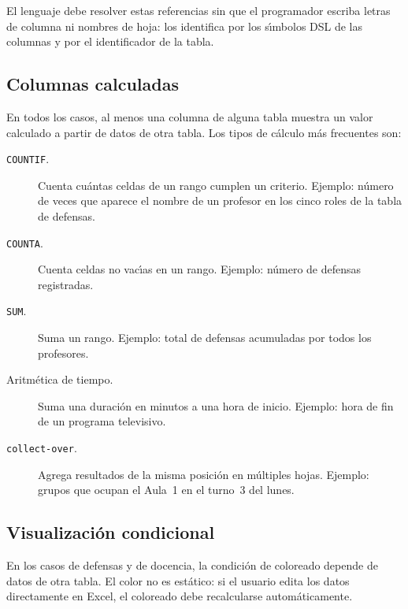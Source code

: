El lenguaje debe resolver estas referencias sin que el programador escriba
letras de columna ni nombres de hoja: los identifica por los s\'{\i}mbolos
DSL de las columnas y por el identificador de la tabla.

\subsection{Columnas calculadas}
\label{ssec:elem-computed}

En todos los casos, al menos una columna de alguna tabla muestra un valor
calculado a partir de datos de otra tabla.  Los tipos de c\'alculo m\'as
frecuentes son:

\begin{description}
  \item[\texttt{COUNTIF}.] Cuenta cu\'antas celdas de un rango cumplen un
    criterio.  Ejemplo: n\'umero de veces que aparece el nombre de un
    profesor en los cinco roles de la tabla de defensas.

  \item[\texttt{COUNTA}.] Cuenta celdas no vac\'{\i}as en un rango.  Ejemplo:
    n\'umero de defensas registradas.

  \item[\texttt{SUM}.] Suma un rango.  Ejemplo: total de defensas acumuladas
    por todos los profesores.

  \item[Aritmética de tiempo.] Suma una duraci\'on en minutos a una hora de
    inicio.  Ejemplo: hora de fin de un programa televisivo.

  \item[\texttt{collect-over}.] Agrega resultados de la misma posici\'on en
    m\'ultiples hojas.  Ejemplo: grupos que ocupan el Aula~1 en el turno~3
    del lunes.
\end{description}

\subsection{Visualizaci\'on condicional}
\label{ssec:elem-condicional}

En los casos de defensas y de docencia, la condici\'on de coloreado depende
de datos de otra tabla.  El color no es est\'atico: si el usuario edita los
datos directamente en Excel, el coloreado debe recalcularse autom\'aticamente.

